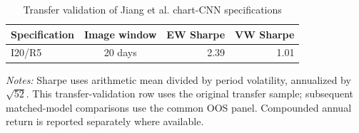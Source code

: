 \begin{table}[htbp]
\centering
\caption{Transfer validation of Jiang et al. chart-CNN specifications}
\label{tab:transfer_validation}
\begin{tabular}{lcrr}
\toprule
Specification & Image window & EW Sharpe & VW Sharpe \\
\midrule
I20/R5 & 20 days & 2.39 & 1.01 \\
\bottomrule
\end{tabular}
\begin{minipage}{0.92\linewidth}
\footnotesize
\textit{Notes:} Sharpe uses arithmetic mean divided by period volatility, annualized by $\sqrt{52}$. This transfer-validation row uses the original transfer sample; subsequent matched-model comparisons use the common OOS panel. Compounded annual return is reported separately where available.
\end{minipage}
\end{table}
